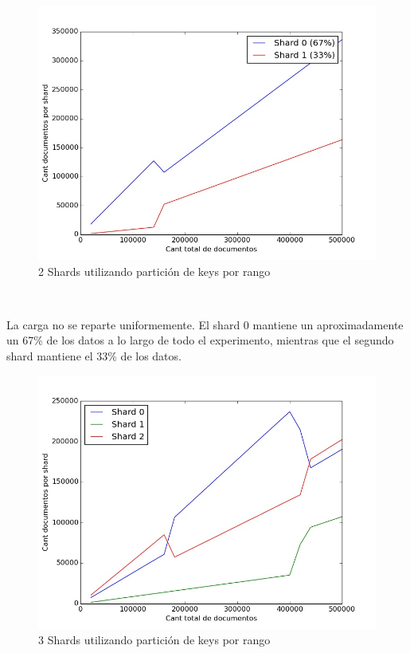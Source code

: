 \begin{figure}[!h]
  \begin{center}
      \includegraphics[scale=0.4]{imagenes/range1.jpg}
      \caption{2 Shards utilizando partición de keys por rango}
      \label{fig:contra1}
  \end{center}
\end{figure}

~

La carga no se reparte uniformemente. El shard 0 mantiene un aproximadamente un 67\% de los datos a lo largo de todo
el experimento, mientras que el segundo shard mantiene el 33\% de los datos.

\begin{figure}[!h]
  \begin{center}
      \includegraphics[scale=0.4]{imagenes/range2.jpg}
      \caption{3 Shards utilizando partición de keys por rango}
      \label{fig:contra1}
  \end{center}
\end{figure}

